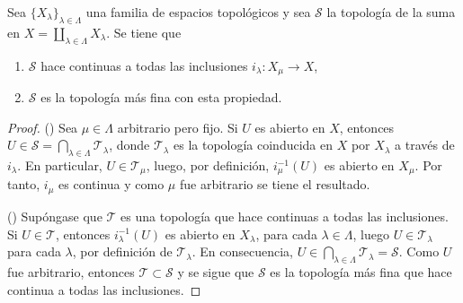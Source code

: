 
\begin{proposition}
Sea $\{ X_{\lambda} \}_{\lambda \in \Lambda}$ una familia de espacios topológicos y sea $\mathcal{S}$ la topología de la suma en $X = \coprod_{\lambda \in \Lambda} X_{\lambda}$. Se tiene que
\begin{enumerate}[label=\textnormal{(\roman*)}]
\item $\mathcal{S}$ hace continuas a todas las inclusiones $i_{\lambda} : X_{\mu} \longrightarrow X$,
\item $\mathcal{S}$ es la topología más fina con esta propiedad.
\end{enumerate} 
\end{proposition}

\begin{proof}
({}) Sea $\mu \in \Lambda$ arbitrario pero fijo. Si $U$ es abierto en $X$, entonces $U \in \mathcal{S} = \bigcap_{\lambda \in \Lambda} \mathcal{T}_{\lambda}$, donde $\mathcal{T}_{\lambda}$ es la topología coinducida en $X$ por $X_{\lambda}$ a través de $i_{\lambda}$. En particular, $U \in \mathcal{T}_{\mu}$, luego, por definición, $i^{-1}_{\mu}(U)$ es abierto en $X_{\mu}$. Por tanto, $i_{\mu}$ es continua y como $\mu$ fue arbitrario se tiene el resultado.
\bigskip

({}) Supóngase que $\mathcal{T}$ es una topología que hace continuas a todas las inclusiones. Si $U \in \mathcal{T}$, entonces $i^{-1}_{\lambda}(U)$ es abierto en $X_{\lambda}$, para cada $\lambda \in \Lambda$, luego $U \in \mathcal{T}_{\lambda}$ para cada $\lambda$, por definición de $\mathcal{T}_{\lambda}$. En consecuencia, $U \in \bigcap_{\lambda \in \Lambda} \mathcal{T}_{\lambda} = \mathcal{S}$. Como $U$ fue arbitrario, entonces $\mathcal{T} \subset \mathcal{S}$ y se sigue que $\mathcal{S}$ es la topología más fina que hace continua a todas las inclusiones.
\end{proof}

